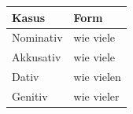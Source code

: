 \documentclass[a4paper]{article}
\begin{document}
    \begin{table}[h]
        \centering
        \begin{tabular}{|l|l|}
            \hline
            \textbf{Kasus} & \textbf{Form} \\
            \hline
            Nominativ      & wie viele     \\
            \hline
            Akkusativ      & wie viele     \\
            \hline
            Dativ          & wie vielen    \\
            \hline
            Genitiv        & wie vieler    \\
            \hline
        \end{tabular}
    \end{table}
\end{document}
